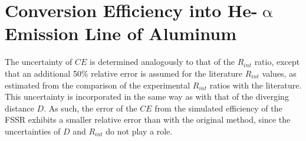 \section{Conversion Efficiency into He-$\upalpha$ Emission Line of Aluminum}

The uncertainty of $CE$ is determined analogously to that of the $R_{int}$ ratio, except that an additional 50\% relative error is assumed for the literature $R_{int}$ values, as estimated from the comparison of the experimental $R_{int}$ ratios with the literature. This uncertainty is incorporated in the same way as with that of the diverging distance $D$. As such, the error of the $CE$ from the simulated efficiency of the FSSR exhibits a smaller relative error than with the original method, since the uncertainties of $D$ and $R_{int}$ do not play a role.
 
